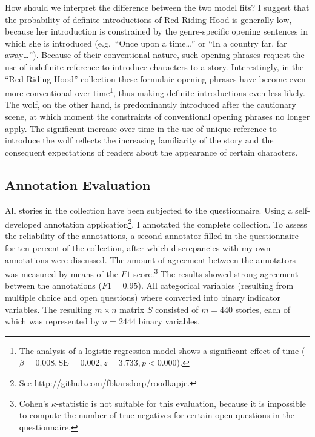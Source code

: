 How should we interpret the difference between the two model fits? I suggest that the probability of definite introductions of Red Riding Hood is generally low, because her introduction is constrained by the genre-specific opening sentences in which she is introduced (e.g.\ ``Once upon a time\ldots'' or ``In a country far, far away\ldots''). Because of their conventional nature, such opening phrases request the use of indefinite reference to introduce characters to a story\autocite[For a more general account of opening formulas in folktales, cf.][]{Karsdorp:2013tk}. Interestingly, in the ``Red Riding Hood'' collection these formulaic opening phrases have become even more conventional over time\footnote{The analysis of a logistic regression model shows a significant effect of time ($\beta=0.008, \textrm{SE} = 0.002, z = 3.733, p < 0.000$).}, thus making definite introductions even less likely. The wolf, on the other hand, is predominantly introduced after the cautionary scene, at which moment the constraints of conventional opening phrases no longer apply. The significant increase over time in the use of unique reference to introduce the wolf reflects the increasing familiarity of the story and the consequent expectations of readers about the appearance of certain characters. 

\subsection{Annotation Evaluation}
All stories in the collection have been subjected to the questionnaire. Using a self-developed annotation application\footnote{See \url{http://github.com/fbkarsdorp/roodkapje}.}, I annotated the complete collection. To assess the reliability of the annotations, a second annotator filled in the questionnaire for ten percent of the collection, after which discrepancies with my own annotations were discussed. The amount of agreement between the annotators was measured by means of the $F1$-score.\footnote{Cohen's $\kappa$-statistic \citeyear{cohen:1960} is not suitable for this evaluation, because it is impossible to compute the number of true negatives for certain open questions in the questionnaire.} The results showed strong agreement between the annotations ($F1 = 0.95$). All categorical variables (resulting from multiple choice and open questions) where converted into binary indicator variables. The resulting $m \times n$ matrix $S$ consisted of $m=440$ stories, each of which was represented by $n=2444$ binary variables.

